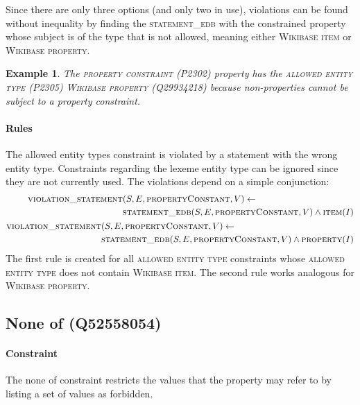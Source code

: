 \documentclass[hyperref,bachelorofscience,fleqn]{cgvpub}
\newtheorem{example}{Example}
\begin{document}
Since there are only three options (and only two in use), violations can be found without inequality by finding the \textsc{statement\_edb} with the constrained property whose subject is of the type that is not allowed, meaning either \textsc{Wikibase item} or \textsc{Wikibase property}.

\begin{example}
The \textsc{property constraint} (P2302) property has the \textsc{allowed entity type} (P2305) \textsc{Wikibase property} (Q29934218) because non-properties cannot be subject to a property constraint.
\end{example}

\paragraph{Rules}
The allowed entity types constraint is violated by a statement with the wrong entity type.  Constraints regarding the lexeme entity type can be ignored since they are not currently used. The violations depend on a simple conjunction:
\begin{align}
\begin{split}
\textsc{violation\_statement}&(S, E, \textsc{propertyConstant}, V) \leftarrow \\
&\textsc{statement\_edb}(S, E, \textsc{propertyConstant}, V) \wedge \textsc{item}(I)
\end{split}\\
\begin{split}
\textsc{violation\_statement}&(S, E, \textsc{propertyConstant}, V) \leftarrow \\
&\textsc{statement\_edb}(S, E, \textsc{propertyConstant}, V) \wedge \textsc{property}(I)
\end{split}
\end{align}
The first rule is created for all \textsc{allowed entity type} constraints whose \textsc{allowed entity type} does not contain \textsc{Wikibase item}. The second rule works analogous for \textsc{Wikibase property}.

\subsection{None of (Q52558054)}
\paragraph{Constraint}
The none of constraint restricts the values that the property may refer to by listing a set of values as forbidden.
\end{document}
